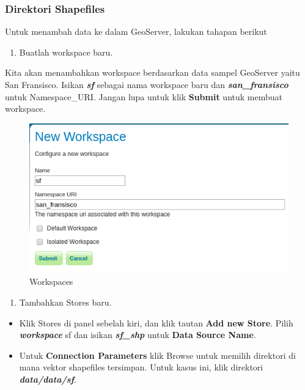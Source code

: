 \documentclass[]{book}
\providecommand{\tightlist}{%
  \setlength{\itemsep}{0pt}\setlength{\parskip}{0pt}}
\begin{document}
\hypertarget{direktori-shapefiles}{%
\subsubsection{Direktori Shapefiles}\label{direktori-shapefiles}}

Untuk menambah data ke dalam GeoServer, lakukan tahapan berikut

\begin{enumerate}
\def\labelenumi{\arabic{enumi}.}
\tightlist
\item
  Buatlah workspace baru.
\end{enumerate}

Kita akan menambahkan workspace berdasarkan data sampel GeoServer yaitu San Fransisco. Isikan \textbf{\emph{sf}} sebagai nama workspace baru dan \textbf{\emph{san\_fransisco}} untuk Namespace\_URI. Jangan lupa untuk klik \textbf{Submit} untuk membuat workspace.

\begin{figure}

{\centering \includegraphics[width=0.6\linewidth]{images/08/gs14} 

}

\caption{Workspaces}\label{fig:gs14}
\end{figure}

\begin{enumerate}
\def\labelenumi{\arabic{enumi}.}
\setcounter{enumi}{1}
\tightlist
\item
  Tambahkan Stores baru.
\end{enumerate}

\begin{itemize}
\item
  Klik Stores di panel sebelah kiri, dan klik tautan \textbf{Add new Store}. Pilih \textbf{\emph{workspace}} sf dan isikan \textbf{\emph{sf\_shp}} untuk \textbf{Data Source Name}.
\item
  Untuk \textbf{Connection Parameters} klik Browse untuk memilih direktori di mana vektor shapefiles tersimpan. Untuk kasus ini, klik direktori \textbf{\emph{data/data/sf}}.
\end{itemize}
\end{document}
